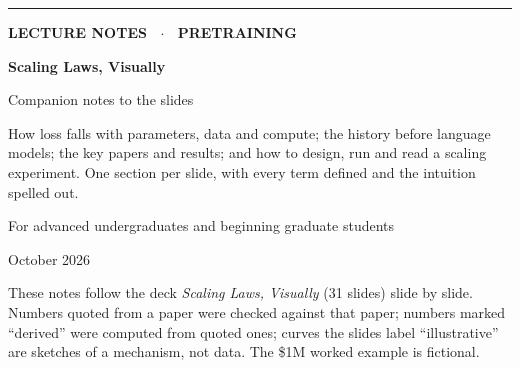 \documentclass[11pt,letterpaper]{article}
\begin{document}
\begin{titlepage}
\thispagestyle{empty}
\vspace*{2.5cm}
{\color{emb}\rule{3cm}{3pt}}\par\vspace{0.6cm}
{\sffamily\bfseries\color{muted}\large LECTURE NOTES \ $\cdot$ \ PRETRAINING\par}
\vspace{0.4cm}
{\sffamily\bfseries\fontsize{34}{38}\selectfont\color{ink} Scaling Laws, Visually\par}
\vspace{0.3cm}
{\sffamily\fontsize{18}{22}\selectfont\color{ink} Companion notes to the slides\par}
\vspace{1.2cm}
{\large\color{muted}\parbox{0.82\textwidth}{How loss falls with parameters, data and compute; the history before language models; the key papers and results; and how to design, run and read a scaling experiment. One section per slide, with every term defined and the intuition spelled out.}\par}
\vspace{1.5cm}
{\color{muted}For advanced undergraduates and beginning graduate students\par}
\vspace{0.3cm}
{\color{muted}October 2026\par}
\vfill
{\small\color{muted}\parbox{0.9\textwidth}{These notes follow the deck \textit{Scaling Laws, Visually} (31 slides) slide by slide. Numbers quoted from a paper were checked against that paper; numbers marked ``derived'' were computed from quoted ones; curves the slides label ``illustrative'' are sketches of a mechanism, not data. The \$1M worked example is fictional.}\par}
\end{titlepage}

\tableofcontents
\clearpage

\end{document}
